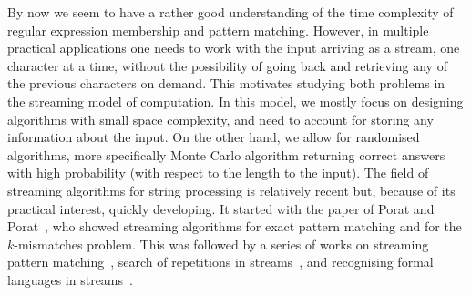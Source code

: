 By now we seem to have a rather good understanding of the time complexity of regular expression membership and pattern
matching. However, in multiple practical applications one needs to work with the input arriving as a stream, one character at a time,
without the possibility of going back and retrieving any of the previous characters on demand. This motivates studying
both problems in the streaming model
of computation. In this model, we mostly focus on designing algorithms with small space complexity, and need to account
for storing any information about the input. On the other hand, we allow for randomised algorithms, more specifically
Monte Carlo algorithm returning correct answers with high probability (with respect to the length to the input).
The field of streaming algorithms for string processing is relatively recent but, because of its practical interest, quickly developing.
It started with the paper of  Porat and Porat~\cite{Porat:09}, who showed streaming algorithms for exact pattern matching and for the $k$-mismatches problem. This was followed by a series of works on streaming pattern matching~\cite{pattern_match_BG14,DBLP:conf/esa/CliffordFPSS15,DBLP:conf/esa/GolanP17, DBLP:conf/soda/CliffordFPSS16, starikovskaya:LIPIcs:2017:7320, DBLP:conf/icalp/GolanKP18, gawrychowski2019streaming,clifford2018streaming,DBLP:conf/cpm/GolanKKP20, DBLP:journals/iandc/RadoszewskiS20,DBLP:journals/corr/abs-2106-06037}, search of repetitions in streams~\cite{Ergun:10,stream-periodicity-mismatches, stream-periodicity-wildcards,DBLP:journals/algorithmica/GawrychowskiMSU19, DBLP:conf/cpm/MerkurevS19, DBLP:conf/spire/MerkurevS19, DBLP:conf/cpm/GawrychowskiRS19}, and recognising formal languages in streams~\cite{DBLP:journals/siamcomp/MagniezMN14,ganardi_et_al:LIPIcs:2018:9131, DBLP:conf/lata/GanardiHL18, ganardi_et_al:LIPIcs:2018:8485, ganardi_et_al:LIPIcs:2016:6853, DBLP:conf/mfcs/GanardiJL18, DBLP:journals/tcs/BabuLRV13, franois_et_al:LIPIcs:2016:6355,ganardi_et_al:LIPIcs:2019:11502,bathie_et_al:LIPIcs.ICALP.2021.119}. 

